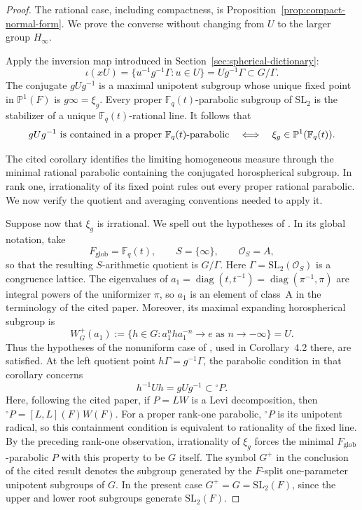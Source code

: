\documentclass[11pt]{amsart}
\theoremstyle{definition}
\theoremstyle{plain}
\newcommand{\Fq}{\mathbb F_q}
\begin{document}
\begin{proof}
The rational case, including compactness, is
Proposition~\ref{prop:compact-normal-form}.  We prove the converse without
changing from \(U\) to the larger group \(H_\infty\).

Apply the inversion map introduced in Section~\ref{sec:spherical-dictionary}:
\[
\iota(xU)=\{u^{-1}g^{-1}\Gamma:u\in U\}=Ug^{-1}\Gamma
       \subset G/\Gamma.
\]
The conjugate \(gUg^{-1}\) is a maximal unipotent subgroup whose unique fixed
point in \(\mathbb P^1(F)\) is \(g\infty=\xi_g\).  Every proper
\(\Fq(t)\)-parabolic subgroup of \(\mathrm{SL}_2\) is the stabilizer of a
unique \(\Fq(t)\)-rational line.  It follows that
\[
gUg^{-1}\ \hbox{is contained in a proper \(\Fq(t)\)-parabolic}
\quad\Longleftrightarrow\quad
\xi_g\in\mathbb P^1(\Fq(t)).
\]

The cited corollary identifies the limiting homogeneous measure through the
minimal rational parabolic containing the conjugated horospherical subgroup.
In rank one, irrationality of its fixed point rules out every proper rational
parabolic.  We now verify the quotient and averaging conventions needed to
apply it.

Suppose now that \(\xi_g\) is irrational.  We spell out the hypotheses of
\cite[Corollary~4.2]{Mohammadi2011}.  In its global notation, take
\[
F_{\mathrm{glob}}=\Fq(t),\qquad S=\{\infty\},\qquad \mathcal O_S=A,
\]
so that the resulting \(S\)-arithmetic quotient is \(G/\Gamma\).  Here
\(\Gamma=\mathrm{SL}_2(\mathcal O_S)\) is a congruence lattice.  The eigenvalues
of \(a_1=\operatorname{diag}(t,t^{-1})=
\operatorname{diag}(\pi^{-1},\pi)\) are integral powers of the uniformizer
\(\pi\), so \(a_1\) is an element of class~A in the terminology of the cited
paper.  Moreover, its maximal expanding horospherical subgroup is
\[
W_G^+(a_1):=\{h\in G:a_1^nha_1^{-n}\longrightarrow e
                  \text{ as }n\longrightarrow-\infty\}=U.
\]
Thus the hypotheses of the nonuniform case of
\cite[Theorem~1.1(ii)]{Mohammadi2011}, used in Corollary~4.2 there, are
satisfied.  At the left
quotient point \(h\Gamma=g^{-1}\Gamma\), the parabolic condition in that
corollary concerns
\[
h^{-1}Uh=gUg^{-1}\subset{}^\circ P.
\]
Here, following the cited paper, if \(P=LW\) is a Levi decomposition, then
\({}^\circ P=[L,L](F)W(F)\).
For a proper rank-one parabolic, \({}^\circ P\) is its unipotent radical, so
this containment condition is equivalent to rationality of the fixed line.
By the preceding rank-one observation, irrationality of \(\xi_g\) forces the
minimal \(F_{\mathrm{glob}}\)-parabolic \(P\) with this property to be \(G\)
itself.  The
symbol \(G^+\) in the conclusion of the cited result denotes the subgroup
generated by the \(F\)-split one-parameter unipotent subgroups of \(G\).  In
the present case \(G^+=G=\mathrm{SL}_2(F)\), since the upper and lower root
subgroups generate \(\mathrm{SL}_2(F)\).


\end{proof}
\end{document}
